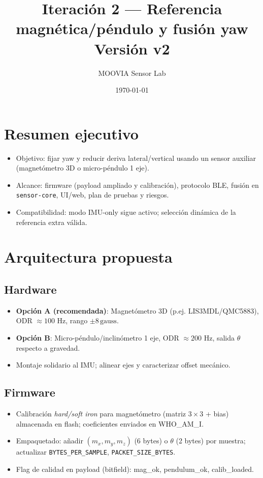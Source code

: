 \documentclass[11pt,a4paper]{article}
\title{Iteraci\'on 2 --- Referencia magn\'etica/p\'endulo y fusi\'on yaw\\\small{Versi\'on v2}}
\author{MOOVIA Sensor Lab}
\date{\today}
\begin{document}
\maketitle

\section*{Resumen ejecutivo}
\begin{itemize}[leftmargin=12pt]
  \item Objetivo: fijar yaw y reducir deriva lateral/vertical usando un sensor auxiliar (magnet\'ometro 3D o micro-p\'endulo 1 eje).
  \item Alcance: firmware (payload ampliado y calibraci\'on), protocolo BLE, fusi\'on en \texttt{sensor-core}, UI/web, plan de pruebas y riesgos.
  \item Compatibilidad: modo IMU-only sigue activo; selecci\'on din\'amica de la referencia extra v\'alida.
\end{itemize}

\section{Arquitectura propuesta}
\subsection{Hardware}
\begin{itemize}[leftmargin=12pt]
  \item \textbf{Opción A (recomendada)}: Magnet\'ometro 3D (p.ej. LIS3MDL/QMC5883), ODR \(\approx100\) Hz, rango \(\pm 8\,\text{gauss}\).
  \item \textbf{Opción B}: Micro-p\'endulo/inclin\'ometro 1 eje, ODR \(\approx200\) Hz, salida \(\theta\) respecto a gravedad.
  \item Montaje solidario al IMU; alinear ejes y caracterizar offset mec\'anico.
\end{itemize}

\subsection{Firmware}
\begin{itemize}[leftmargin=12pt]
  \item Calibraci\'on \emph{hard/soft iron} para magnet\'ometro (matriz \(3\times3\) + bias) almacenada en flash; coeficientes enviados en WHO\_AM\_I.
  \item Empaquetado: añadir \((m_x,m_y,m_z)\) (6 bytes) o \(\theta\) (2 bytes) por muestra; actualizar \texttt{BYTES\_PER\_SAMPLE}, \texttt{PACKET\_SIZE\_BYTES}.
  \item Flag de calidad en payload (bitfield): mag\_ok, pendulum\_ok, calib\_loaded.
\end{itemize}
\end{document}
